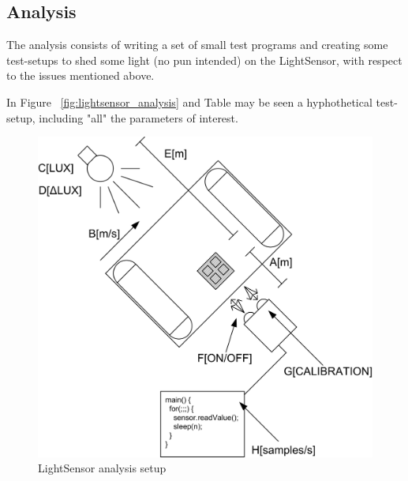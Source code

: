 \documentclass[11pt,a4]{article}
\begin{document}
\subsection{Analysis}
The analysis consists of writing a set of small test programs and creating some test-setups to shed some light (no pun intended) on the LightSensor, with respect to the issues mentioned above. 

In Figure ~\ref{fig:lightsensor_analysis} and Table may be seen a hyphothetical test-setup, including "all" the parameters of interest. 

\begin{figure}[jpg]
\centering
\includegraphics{lightsensor_analysis}
\caption{LightSensor analysis setup}
\label{fig:lightsensor_analysis_setup}
\end{figure}
\end{document}
